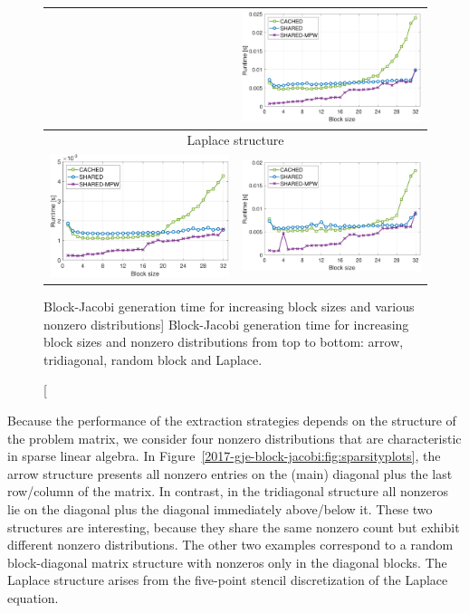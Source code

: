 \begin{figure}[p]
\begin{center}
{\begin{tabular}{cc}
&
\includegraphics[width=.46\columnwidth]{plots/RND_bjp_setup_bs_d_P100.pdf}\\
\hline
\multicolumn{2}{c}{Laplace structure}\\
\includegraphics[width=.46\columnwidth]{plots/LAP_bjp_setup_bs_d_K40.pdf}
&
\includegraphics[width=.46\columnwidth]{plots/LAP_bjp_setup_bs_d_P100.pdf}\\
\end{tabular}
}
\end{center}
\caption
[Block-Jacobi generation time for increasing block sizes and various nonzero
distributions]
{Block-Jacobi generation time for increasing block sizes and nonzero distributions
from top to bottom: arrow, tridiagonal, random block and Laplace.
}
\label{2017-gje-block-jacobi:fig:block-jacobi-runtime}
\end{figure}

Because the performance of the extraction strategies depends on the structure of the
problem matrix, we consider four nonzero distributions that are characteristic
in sparse linear algebra. In Figure~\ref{2017-gje-block-jacobi:fig:sparsityplots}, the arrow
	structure presents all nonzero entries on the (main) diagonal plus the last
row/column of the matrix. In contrast, in the tridiagonal structure all
nonzeros lie on the diagonal plus the diagonal immediately above/below it. These
two structures are interesting, because they share the same nonzero count but exhibit
different nonzero distributions. The other two examples correspond to a 
random block-diagonal matrix structure with nonzeros only in the
diagonal blocks. The Laplace structure arises from the five-point
stencil discretization of the Laplace equation.

